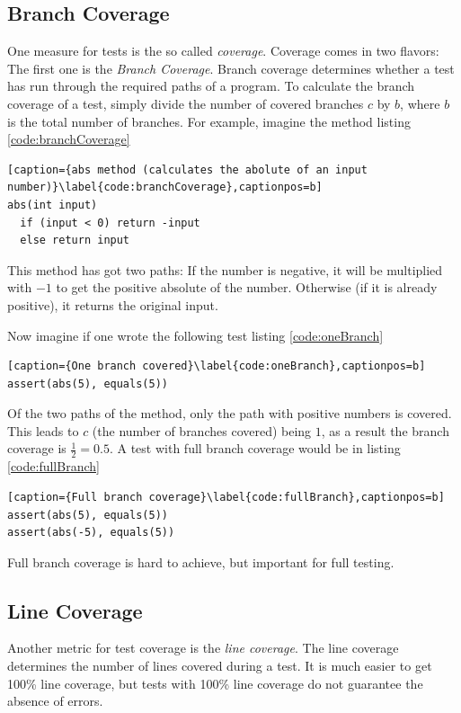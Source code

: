 \subsection{Branch Coverage}

One measure for tests is the so called \textit{coverage}. Coverage
comes in two flavors: The first one is the \textit{Branch Coverage}.
Branch coverage determines whether a test has run through the
required paths of a program. To calculate the branch coverage of a test,
simply divide the number of covered branches $c$ by $b$, where $b$ is the
total number of branches. For example, imagine the method listing \ref{code:branchCoverage}

\begin{lstlisting}[caption={abs method (calculates the abolute of an input number)}\label{code:branchCoverage},captionpos=b]
abs(int input)
  if (input < 0) return -input
  else return input
\end{lstlisting}

This method has got two paths: If the number is negative, it will
be multiplied with $-1$ to get the positive absolute of the number.
Otherwise (if it is already positive), it returns the original input.

Now imagine if one wrote the following test listing \ref{code:oneBranch}

\begin{lstlisting}[caption={One branch covered}\label{code:oneBranch},captionpos=b]
assert(abs(5), equals(5))
\end{lstlisting}

Of the two paths of the method, only the path with positive numbers is
covered. This leads to $c$ (the number of branches covered) being $1$,
as a result the branch coverage is $\frac{1}{2} = 0.5$. A test with
full branch coverage would be in listing \ref{code:fullBranch}

\begin{lstlisting}[caption={Full branch coverage}\label{code:fullBranch},captionpos=b]
assert(abs(5), equals(5))
assert(abs(-5), equals(5))
\end{lstlisting}

Full branch coverage is hard to achieve, but important for full testing.

\subsection{Line Coverage}

Another metric for test coverage is the \textit{line coverage}. The line
coverage determines the number of lines covered during a test. It is much
easier to get 100\% line coverage, but tests with 100\% line coverage do
not guarantee the absence of errors. \cite{bad_line_coverage}

